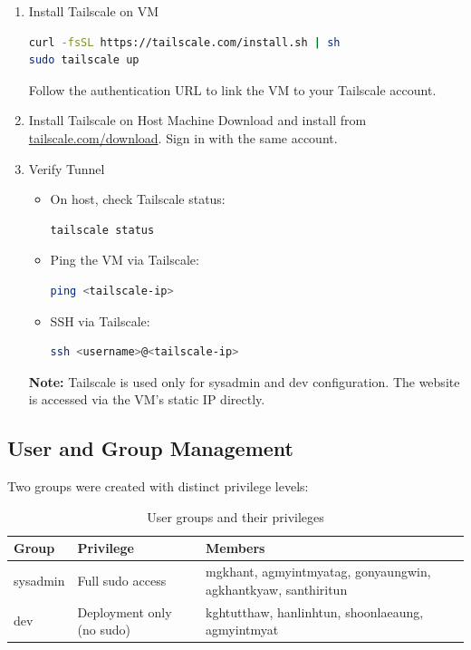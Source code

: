 \documentclass[12pt,a4paper]{report}
\begin{document}
\begin{enumerate}
\item Install Tailscale on VM
\begin{lstlisting}[language=bash]
curl -fsSL https://tailscale.com/install.sh | sh
sudo tailscale up
\end{lstlisting}

\begin{markdownnote}
Follow the authentication URL to link the VM to your Tailscale account.
\end{markdownnote}

\item Install Tailscale on Host Machine
Download and install from \href{https://tailscale.com/download}{tailscale.com/download}. Sign in with the same account.
\item Verify Tunnel
\begin{itemize}
\item On host, check Tailscale status:
\begin{lstlisting}[language=bash]
tailscale status
\end{lstlisting}
\item Ping the VM via Tailscale:
\begin{lstlisting}[language=bash]
ping <tailscale-ip>
\end{lstlisting}
\item SSH via Tailscale:
\begin{lstlisting}[language=bash]
ssh <username>@<tailscale-ip>
\end{lstlisting}
\end{itemize}
\begin{markdownnote}
\textbf{Note:} Tailscale is used only for sysadmin and dev configuration. The website is accessed via the VM's static IP directly.
\end{markdownnote}
\end{enumerate}

\subsection{User and Group Management}

Two groups were created with distinct privilege levels:

\begin{table}[H]
\centering
\begin{tabularx}{\textwidth}{l l X}
\toprule
\textbf{Group} & \textbf{Privilege} & \textbf{Members} \\
\midrule
sysadmin & Full sudo access & mgkhant, agmyintmyatag, gonyaungwin, agkhantkyaw, santhiritun \\
dev      & Deployment only (no sudo) & kghtutthaw, hanlinhtun, shoonlaeaung, agmyintmyat \\
\bottomrule
\end{tabularx}
\caption{User groups and their privileges}
\end{table}
\end{document}
